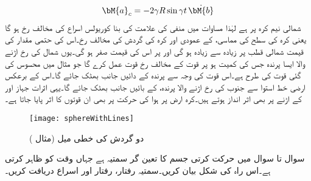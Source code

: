 \begin{align}\label{مساوات_الاحصاء_دو_گردش_ث}
\bM{a}_c=-2\gamma R\sin \gamma t \,\dot{\bM{b}}
\end{align}
شمالی نیم کرہ پر  ہے لہٰذا مساوات  میں منفی کی علامت کی بنا کوریولس اسراع  کی مخالف رخ ہو گا یعنی کرہ کی سطح کی مماسی،   کے عمودی اور کرہ کی گردش کی مخالف رخ۔اس کی حتمی مقدار  کی قیمت شمالی قطب پر زیادہ سے زیادہ ہو گی اور  پر اس کی قیمت صفر ہو گی۔یوں شمال کی رخ اڑنے والا ایسا  پرندہ  جس کی کمیت  ہو پر قوت   کے مخالف رخ قوت  عمل کرے گا جو مثال   میں محسوس کی گئی قوت کی طرح ہے۔اس قوت کی وجہ سے پرندہ  کے دائیں جانب بھٹک جائے گا۔اس کے برعکس ارضی خط استوا سے جنوب کی رخ اڑنے والا  پرندہ،  کے بائیں جانب بھٹک جائے گا۔یہی اثرات جہاز اور  کے اڑنے پر بھی اثر انداز ہوتے ہیں۔کرہ ارض پر ہوا کی حرکت پر بھی ان قوتوں کا اثر پایا جاتا ہے۔
\begin{figure}
\centering
\texttt{[image: sphereWithLines]}
\caption{دو گردش کی خطی میل (مثال )}
\label{شکل_مثال_الاحصاء_دو_گردش_کی_میل}
\end{figure}

سوال  تا سوال  میں حرکت کرتی جسم کا تعین گر سمتیہ  ہے جہاں  وقت کو ظاہر کرتی ہے۔اس راہ کی شکل بیان کریں۔سمتیہ رفتار، رفتار اور اسراع دریافت کریں۔

